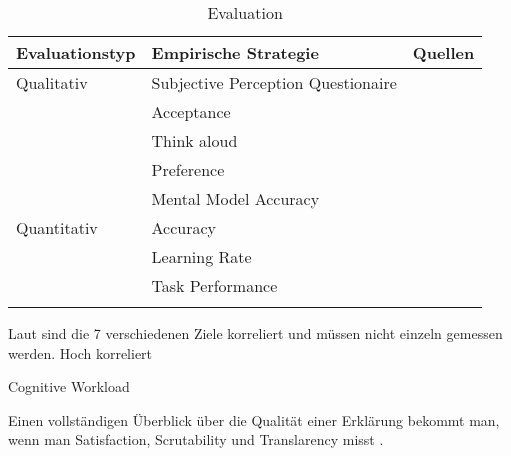 \begin{longtable}{|p{}|p{}|p{}|}
    \hline
    \textbf{Evaluationstyp} & \textbf{Empirische Strategie} & \textbf{Quellen} \\ \hline
    Qualitativ              & Subjective Perception Questionaire &  \cite{balog_measuring_2020} \cite{sato_context_nodate} \cite{waa_evaluating_2021} \cite{eiband_impact_2019}  \cite{kouki_user_2017} \cite{tsai_evaluating_2019} \cite{hernandez-bocanegra_effects_2020} \cite{zahedi_towards_2019} \cite{tsai_effects_2020} \cite{ribera2019can} \\
                            & Acceptance & \cite{tintarev_designing_nodate} \cite{hernandez-bocanegra_effects_2020} \cite{kunkel_let_2019} \\
                            & Think aloud & \cite{wiegand_id_2020} \cite{yamada_evaluating_2016} \\
                            & Preference & \cite{kouki_user_2017} \cite{mucha_interfaces_2021} \cite{abdulrahman_belief-based_2019} \cite{waa_evaluating_2021} \cite{wiegand_id_2020} \cite{stange_effects_2021} \cite{kaptein_personalised_2017} \\
                            & Mental Model Accuracy & \cite{gunning2019darpa} \\
    \hline
    Quantitativ             & Accuracy & \cite{tintarev_designing_nodate} \cite{waa_evaluating_2021} \cite{mucha_interfaces_2021}  \cite{kunkel_let_2019} \cite{zolotas_towards_2019} \\
                            & Learning Rate & \cite{tintarev_designing_nodate} \cite{gunning2019darpa} \\
                            & Task Performance & \cite{waa_evaluating_2021}  \cite{mucha_interfaces_2021}  \cite{abdulrahman_belief-based_2019} \cite{zolotas_towards_2019} \cite{martin_developing_2019} \cite{martin_evaluating_2021} \cite{gunning2019darpa} \\
    \hline
\caption{Evaluation}
\label{tab:evaluation_of_explanations}
\end{longtable}

Laut \cite{balog_measuring_2020} sind die 7 verschiedenen Ziele korreliert und müssen nicht einzeln gemessen werden. Hoch korreliert \cite{kouki_user_2017}

Cognitive Workload \cite{wiegand2019drive, wiegand_id_2020}

Einen vollständigen Überblick über die Qualität einer Erklärung bekommt man, wenn man Satisfaction, Scrutability und Translarency misst \cite{balog_measuring_2020}.

